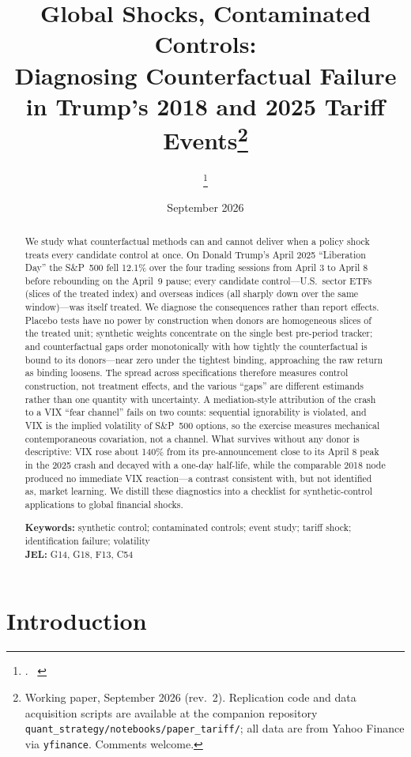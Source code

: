\documentclass[11pt,a4paper]{article}
\title{\textbf{Global Shocks, Contaminated Controls:\\
Diagnosing Counterfactual Failure in Trump's 2018 and 2025 Tariff Events\thanks{%
Working paper, September 2026 (rev.~2). Replication code and data acquisition
scripts are available at the companion repository
\texttt{quant\_strategy/notebooks/paper\_tariff/}; all data are from Yahoo
Finance via \texttt{yfinance}. Comments welcome.}}}
\author{\authorname\thanks{\authoremail. \ \authoraffil}}
\date{September 2026}
\begin{document}
\maketitle

\begin{abstract}
\noindent
We study what counterfactual methods can and cannot deliver when a policy
shock treats every candidate control at once. On Donald Trump's April 2025
``Liberation Day'' the S\&P~500 fell 12.1\% over the four trading sessions
from April 3 to April 8 before rebounding on the April~9 pause; every
candidate control---U.S.\ sector ETFs
(slices of the treated index) and overseas indices (all sharply down over
the same window)---was itself treated. We diagnose the consequences rather
than report effects. Placebo tests have no power by construction when donors
are homogeneous slices of the treated unit; synthetic weights concentrate on
the single best pre-period tracker; and counterfactual gaps order
monotonically with how tightly the counterfactual is bound to its
donors---near zero under the tightest binding, approaching the raw return as
binding loosens. The spread across specifications therefore measures control
construction, not treatment effects, and the various ``gaps'' are different
estimands rather than one quantity with uncertainty. A mediation-style
attribution of the crash to a VIX ``fear channel'' fails on two counts:
sequential ignorability is violated, and VIX is the implied volatility of
S\&P~500 options, so the exercise measures mechanical contemporaneous
covariation, not a channel. What survives without any donor is descriptive:
VIX rose about 140\% from its pre-announcement close to its April 8 peak
in the 2025 crash and decayed
with a one-day half-life, while the comparable 2018 node produced no
immediate VIX reaction---a contrast consistent with, but not identified
as, market learning. We distill these diagnostics into a checklist for
synthetic-control applications to global financial shocks.

\medskip
\noindent\textbf{Keywords:} synthetic control; contaminated controls; event
study; tariff shock; identification failure; volatility \\
\noindent\textbf{JEL:} G14, G18, F13, C54

\end{abstract}

\newpage
\tableofcontents
\newpage

\section{Introduction}\label{sec:intro}
\end{document}

